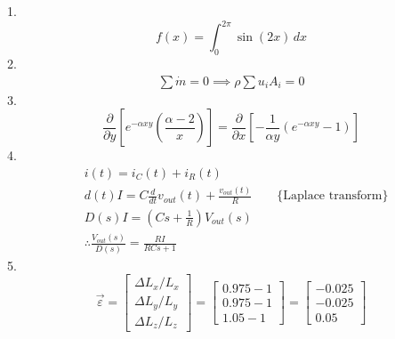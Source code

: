 1.
    \begin{equation*}
        f(x) = \int_{0}^{2\pi} \sin(2x) \,dx
    \end{equation*}
2.
    \begin{align*}
        \sum \dot{m} = 0 \implies \rho \sum u_i A_i = 0
    \end{align*}
3.
    \begin{equation*}
        \frac{\partial}{\partial y} \left[
            e^{-\alpha xy} \left( \frac{\alpha - 2}{x} \right)
        \right]
        =
        \frac{\partial}{\partial x} \left[
            -\frac{1}{\alpha y} \left(
                e^{- \alpha xy} - 1
            \right)
        \right]
    \end{equation*}
4. 
    \begin{align*}
        & i(t) = i_C(t) + i_R(t) \\
        & d(t)I = C \frac{d}{dt}v_{out}(t) + \frac{v_{out}(t)}{R} \qquad \{\text{Laplace transform}\} \\
        & D(s)I = \left( Cs + \frac{1}{R} \right)V_{out}(s) \\
        & \therefore \frac{V_{out}(s)}{D(s)} = \frac{RI}{RCs+1}
    \end{align*}
5.
    \begin{equation*}
        \vec{\varepsilon} =
            \begin{bmatrix}
                \Delta L_x/L_x \\ \Delta L_y/L_y \\ \Delta L_z/L_z
            \end{bmatrix}
        =
            \begin{bmatrix}
                0.975-1 \\ 0.975-1 \\ 1.05-1
            \end{bmatrix}
        =
            \begin{bmatrix}
                -0.025 \\ -0.025 \\ 0.05
            \end{bmatrix}
    \end{equation*}